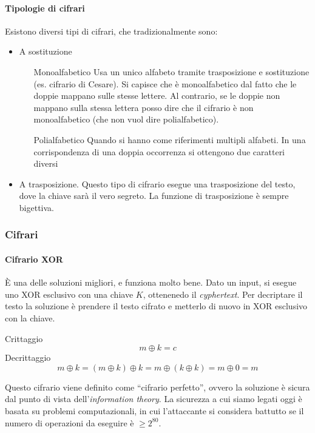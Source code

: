 \paragraph*{Tipologie di cifrari} Esistono diversi tipi di cifrari, che 
tradizionalmente sono:
\begin{itemize}
 \item A sostituzione
 \begin{itemize}
  \item[Monoalfabetico] Usa un unico alfabeto tramite trasposizione e 
sostituzione (es. cifrario di 
Cesare). Si capisce che è monoalfabetico dal fatto che le doppie mappano sulle 
stesse lettere.
Al contrario, se le doppie non mappano sulla stessa lettera posso dire che il 
cifrario è non monoalfabetico (che non vuol dire polialfabetico).

  \item[Polialfabetico] Quando si hanno come riferimenti multipli alfabeti.
 In una corrispondenza di una doppia occorrenza si ottengono due caratteri 
diversi
 \end{itemize}
 \item A trasposizione. Questo tipo di cifrario esegue una trasposizione del 
testo, dove la chiave sarà il vero segreto. La funzione di trasposizione è 
sempre bigettiva. 
\end{itemize}

\subsubsection{Cifrari}

\paragraph{Cifrario XOR}

È una delle soluzioni migliori, e funziona molto bene. Dato un input, si esegue 
uno XOR esclusivo con una chiave $K$, ottenenedo il \textit{cyphertext}. Per 
decriptare il testo la soluzione è prendere il testo cifrato e metterlo di nuovo 
in XOR esclusivo con la chiave.

Crittaggio
$$
m \oplus k = c
$$
\indent Decrittaggio
$$
m \oplus k = (m \oplus k) \oplus k = m \oplus (k \oplus k) = m \oplus 0 = m
$$

Questo cifrario viene definito come ``cifrario perfetto'', ovvero la soluzione è 
sicura dal punto di vista dell'\textit{information theory}. La sicurezza a cui 
siamo legati oggi è basata su problemi computazionali, in cui l'attaccante si 
considera battutto se il numero di operazioni da eseguire è $\ge 2^{80}$.

